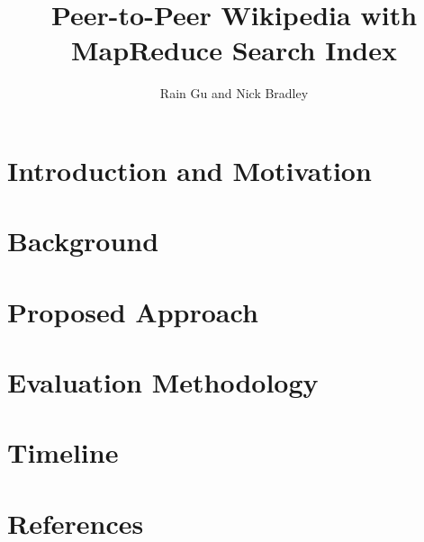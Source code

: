 \documentclass{article}
\title{Peer-to-Peer Wikipedia with MapReduce Search Index}
\author{Rain Gu and Nick Bradley}
\begin{document}
\maketitle

\section{Introduction and Motivation}
\section{Background}
\section{Proposed Approach}
\section{Evaluation Methodology}
\section{Timeline}
\section{References}
\end{document}
